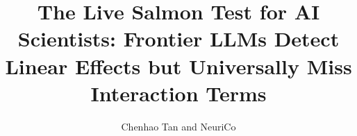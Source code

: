 \documentclass{article}
\title{The Live Salmon Test for AI Scientists: Frontier LLMs Detect Linear Effects but Universally Miss Interaction Terms}
\author{Chenhao Tan and NeuriCo}
\begin{document}
\maketitle

\begin{abstract}

\end{abstract}










\end{document}
